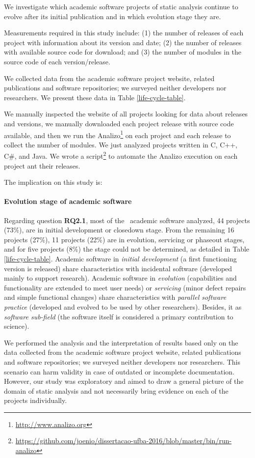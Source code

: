 \noindent \StudyThreeQuestionOne We investigate  which academic software
projects of static analysis continue to evolve after its initial publication and 
in which evolution stage they are.

Measurements required in this study include:
  (1) the number of releases of each project with information about its version and date;
  (2) the number of releases with available source code for download; and
  (3) the number of modules in the source code of each version/release.

%
We collected data from the academic software project website, related
publications and software repositories; we surveyed neither developers nor
researchers. We present these data in Table \ref{life-cycle-table}.



We manually inspected the website of all projects looking for data about releases and versions, we manually downloaded each project release with source code available, and then we run the Analizo\footnote{\url{http://www.analizo.org}} on each project and each release to collect the number of modules. We just analyzed projects written in C, C++, C\#, and Java. We wrote a script\footnote{\url{https://github.com/joenio/dissertacao-ufba-2016/blob/master/bin/run-analizo}} to automate the Analizo execution on each project ant their releases.

%
The implication on this study is:

\paragraph{\bf Evolution stage of academic software}
Regarding question \textbf{RQ2.1}, most of the \SoftwareCount \ academic
software analyzed, 44 projects (73\%), are in initial development or closedown
stage.  From the remaining 16 projects (27\%), 11 projects (22\%) are in
evolution, servicing or phaseout stages, and for five projects (8\%) the stage
could not be determined, as detailed in Table \ref{life-cycle-table}.
%
Academic software in \textit{initial development} (a first functioning version
is released) share characteristics with incidental software
\cite{howison2011scientific} (developed mainly to support research).  Academic
software in \textit{evolution} (capabilities and functionality are extended to
meet user needs) or \textit{servicing} (minor defect repairs and simple
functional changes) share characteristics  with {\it parallel software
practice} (developed and evolved to be used by other researchers). Besides, it
as {\it software sub-field} (the software itself is considered a primary
contribution to science).

%
We performed the analysis and the interpretation of results based only on the
data collected from the academic software project website, related publications
and software repositories; we surveyed neither developers nor researchers. This
scenario can harm validity in case of outdated or incomplete documentation.
However, our study was exploratory and aimed to draw a general picture of the
domain of static analysis and not necessarily bring evidence on each of the
projects individually.
